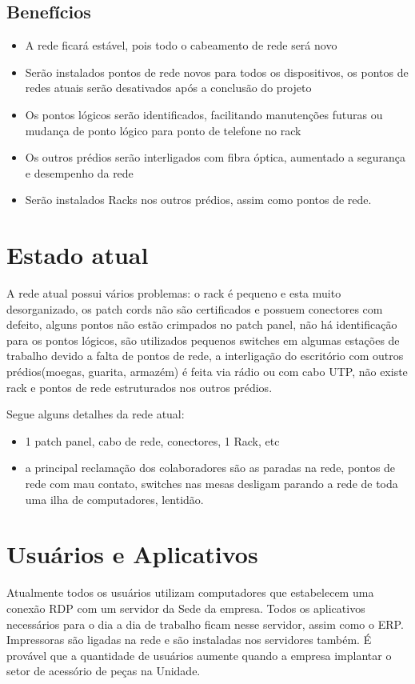 \documentclass[	DIV=calc,%
							paper=a4,%
							fontsize=12pt,%
							onecolumn]{scrartcl}	 					%
\begin{document}
\subsection{Benefícios}
\begin{itemize}
	
	\item A rede ficará estável, pois todo o cabeamento de rede será novo
	\item Serão instalados pontos de rede novos para todos os dispositivos, os pontos de redes atuais serão desativados após a conclusão do projeto
	\item Os pontos lógicos serão identificados, facilitando manutenções futuras ou mudança de ponto lógico para ponto de telefone no rack 
	\item Os outros prédios serão interligados com fibra óptica, aumentado a segurança e desempenho da rede
	\item Serão instalados Racks nos outros prédios, assim como pontos de rede.
\end{itemize}

\section{Estado atual}
A rede atual possui vários problemas:
o rack é pequeno e esta muito desorganizado, os patch cords não são certificados e possuem conectores com defeito, alguns pontos não estão crimpados no patch panel, não há identificação para os pontos lógicos, são utilizados pequenos switches em algumas estações de trabalho devido a falta de pontos de rede, a interligação do escritório com outros prédios(moegas, guarita, armazém) é feita via rádio ou com cabo UTP, não existe rack e pontos de rede estruturados nos outros prédios.

Segue alguns detalhes da rede atual:
\begin{itemize}
	\item 1 patch panel, cabo de rede, conectores, 1 Rack, etc
	\item a principal reclamação dos colaboradores são as paradas na rede, pontos de rede com mau contato, switches nas mesas desligam parando a rede de toda uma ilha de computadores, lentidão.
\end{itemize}


\section{Usuários e Aplicativos}
Atualmente todos os usuários utilizam computadores que estabelecem uma conexão RDP com um servidor da Sede da empresa. Todos os aplicativos necessários para o dia a dia de trabalho ficam nesse servidor, assim como o ERP. Impressoras são ligadas na rede e são instaladas nos servidores também. É provável que a quantidade de usuários aumente quando a empresa implantar o setor de acessório de peças na Unidade.
 
\end{document}
